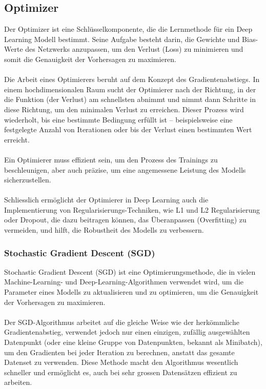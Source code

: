 \documentclass{article}
\begin{document}
\newpage
\subsection{Optimizer}

Der Optimizer ist eine Schlüsselkomponente, die die Lernmethode für ein Deep Learning Modell bestimmt. Seine Aufgabe besteht darin, die Gewichte und Bias-Werte des Netzwerks anzupassen, um den Verlust (Loss) zu minimieren und somit die Genauigkeit der Vorhersagen zu maximieren.\\\\
Die Arbeit eines Optimierers beruht auf dem Konzept des Gradientenabstiegs. In einem hochdimensionalen Raum sucht der Optimierer nach der Richtung, in der die Funktion (der Verlust) am schnellsten abnimmt und nimmt dann Schritte in diese Richtung, um den minimalen Verlust zu erreichen. Dieser Prozess wird wiederholt, bis eine bestimmte Bedingung erfüllt ist – beispielsweise eine festgelegte Anzahl von Iterationen oder bis der Verlust einen bestimmten Wert erreicht.\\\\
Ein Optimierer muss effizient sein, um den Prozess des Trainings zu beschleunigen, aber auch präzise, um eine angemessene Leistung des Modells sicherzustellen.\\\\
Schliesslich ermöglicht der Optimierer in Deep Learning auch die Implementierung von Regularisierungs-Techniken, wie L1 und L2 Regularisierung oder Dropout, die dazu beitragen können, das Überanpassen (Overfitting) zu vermeiden, und hilft, die Robustheit des Modells zu verbessern.

\subsubsection{Stochastic Gradient Descent (SGD)}

Stochastic Gradient Descent (SGD) ist eine Optimierungsmethode, die in vielen Machine-Learning- und Deep-Learning-Algorithmen verwendet wird, um die Parameter eines Modells zu aktualisieren und zu optimieren, um die Genauigkeit der Vorhersagen zu maximieren.\\\\
Der SGD-Algorithmus arbeitet auf die gleiche Weise wie der herkömmliche Gradientenabstieg, verwendet jedoch nur einen einzigen, zufällig ausgewählten Datenpunkt (oder eine kleine Gruppe von Datenpunkten, bekannt als Minibatch), um den Gradienten bei jeder Iteration zu berechnen, anstatt das gesamte Datenset zu verwenden. Diese Methode macht den Algorithmus wesentlich schneller und ermöglicht es, auch bei sehr grossen Datensätzen effizient zu arbeiten.
\end{document}
